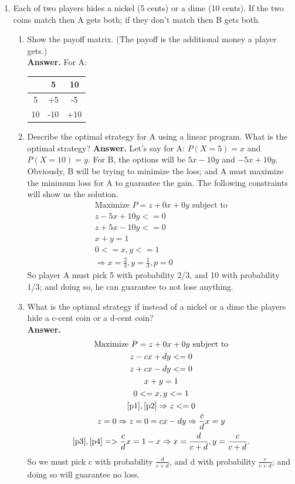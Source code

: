 \documentclass[letterpaper,12pt]{article}
\begin{document}
\begin{enumerate}
\item  Each of two players hides a nickel (5 cents) or a dime (10 cents). If the two coins match then A gets both; if they don't match then B gets both. 
\begin {enumerate}
	\item Show the payoff matrix. (The payoff is the additional money a player gets.)\\
	\textbf{Answer.} For A:
	\begin{table}[ht!]
		\centering
		\begin{tabular}{|c|c|c|}
		\hline
		 	&	5	&	10\\ \hline
		 5	&	+5	&	-5\\ \hline
		 10 &	-10 &	+10\\ \hline
		\end{tabular}
	\end{table}
	\item  Describe the optimal strategy for A using a linear program. What is the optimal strategy?
	\textbf{Answer.} Let's say for A: $P(X=5)=x$ and $P(X=10)=y$. For B, the options will be $5x-10y$ and $-5x+10y$. Obviously, B will be trying to minimize the loss; and A must maximize the minimum loss for A to guarantee the gain. The following constraints will show us the solution.
	\begin{gather}
		\text{Maximize }P=z+0x+0y\text{ subject to}\\
		z-5x+10y <= 0\\
		z+5x-10y <= 0\\
		x + y = 1\\
		0 <= x, y <= 1\\
		\Rightarrow x = \frac{2}{3}, y = \frac{1}{3}, p = 0
	\end{gather}
	So player A must pick 5 with probability 2/3, and 10 with probability 1/3; and doing so, he can guarantee to not lose anything.
	\item What is the optimal strategy if instead of a nickel or a dime the players hide a c-cent coin or a d-cent coin?\\
	\textbf{Answer.}
	\begin{gather}
		\text{Maximize }P=z+0x+0y\text{ subject to}\\
		z-cx+dy <= 0 \label{p1}\\
		z+cx-dy <= 0 \label{p2}\\
		x + y = 1 \label{p3}\\
		0 <= x, y <= 1\\
		\ref{p1}, \ref{p2} \Rightarrow z <= 0\\
		z=0 \Rightarrow z=0=cx-dy \Rightarrow \frac{c}{d}x=y \label{p4}\\
		\ref{p3}, \ref{p4} => \frac{c}{d}x=1-x \Rightarrow x=\frac{d}{c+d}, y=\frac{c}{c+d}.
	\end{gather}
	So we must pick c with probability $\frac{d}{c+d}$, and d with probability $\frac{c}{c+d}$; and doing so will guarantee no loss.
\end{enumerate}

\end{enumerate}
\end{document}
